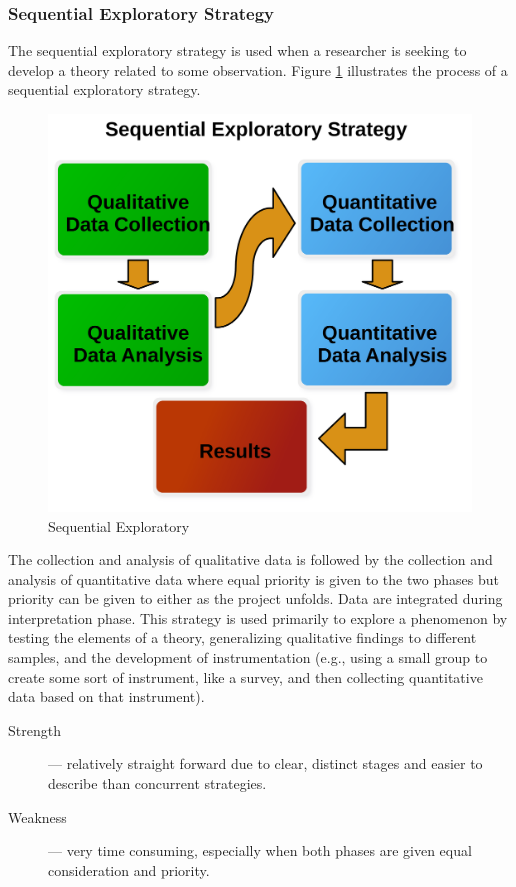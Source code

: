\subsubsection{Sequential Exploratory Strategy}

The sequential exploratory strategy is used when a researcher is seeking to develop a theory related to some observation. Figure \ref{14:fig91} illustrates the process of a sequential exploratory strategy. 

\begin{figure}[H]
	\centering
	\includegraphics[width=\maxwidth{.95\linewidth}]{gfx/14-Seq_Explore}
	\caption{Sequential Exploratory}
	\label{14:fig91}
\end{figure}

The collection and analysis of qualitative data is followed by the collection and analysis of quantitative data where equal priority is given to the two phases but priority can be given to either as the project unfolds. Data are integrated during interpretation phase. This strategy is used primarily to explore a phenomenon by testing the elements of a theory, generalizing qualitative findings to different samples, and the development of instrumentation (e.g., using a small group to create some sort of instrument, like a survey, and then collecting quantitative data based on that instrument).

\begin{description}
	\item[Strength] --- relatively straight forward due to clear, distinct stages and easier to describe than concurrent strategies.
	\item[Weakness] --- very time consuming, especially when both phases are given equal consideration and priority.
\end{description}

